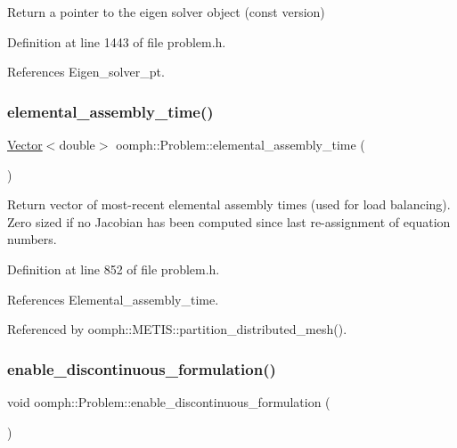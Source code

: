 Return a pointer to the eigen solver object (const version) 



Definition at line 1443 of file problem.\+h.



References Eigen\+\_\+solver\+\_\+pt.

\mbox{\label{classoomph_1_1Problem_aa8da092e78c9af112580ddb667a15d97}} 
\subsubsection{\texorpdfstring{elemental\+\_\+assembly\+\_\+time()}{elemental\_assembly\_time()}}
{\footnotesize\ttfamily \hyperlink{classoomph_1_1Vector}{Vector}$<$double$>$ oomph\+::\+Problem\+::elemental\+\_\+assembly\+\_\+time (\begin{DoxyParamCaption}{ }\end{DoxyParamCaption})\hspace{0.3cm}{\ttfamily [inline]}}



Return vector of most-\/recent elemental assembly times (used for load balancing). Zero sized if no Jacobian has been computed since last re-\/assignment of equation numbers. 



Definition at line 852 of file problem.\+h.



References Elemental\+\_\+assembly\+\_\+time.



Referenced by oomph\+::\+M\+E\+T\+I\+S\+::partition\+\_\+distributed\+\_\+mesh().

\mbox{\label{classoomph_1_1Problem_af4fbd755b3ce6b86fa0f1b1f29bd08f0}} 
\subsubsection{\texorpdfstring{enable\+\_\+discontinuous\+\_\+formulation()}{enable\_discontinuous\_formulation()}}
{\footnotesize\ttfamily void oomph\+::\+Problem\+::enable\+\_\+discontinuous\+\_\+formulation (\begin{DoxyParamCaption}{ }\end{DoxyParamCaption})\hspace{0.3cm}{\ttfamily [inline]}}



